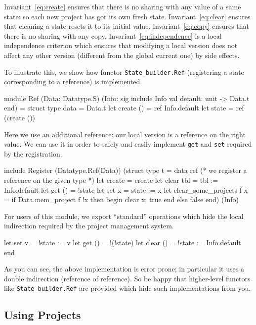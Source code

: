 Invariant~\ref{eq:create} ensures that there is no sharing%
 with any value of a same state: so each new project has
got its own fresh state. Invariant~\ref{eq:clear} ensures that cleaning
a state resets it to its initial
value. Invariant~\ref{eq:copy} ensures that there is no sharing with any
copy. Invariant~\ref{eq:independence} is a local independence criterion which
ensures that modifying a local version does not affect any other version
(different from the global current one) by side effects.
\begin{example}
  To illustrate this, we show how functor
  \texttt{State\_builder.Ref} (registering a state
  corresponding to a reference) is implemented.
\begin{ocamlcode}
module Ref
  (Data: Datatype.S)
  (Info: sig include Info val default: unit -> Data.t end) =
struct
  type data = Data.t
  let create () = ref Info.default
  let state = ref (create ())
\end{ocamlcode}
Here we use an additional reference: our local version%
 is a reference on the right value. We can
use it in order to safely and easily implement \texttt{get} and \texttt{set}
required by the registration.
\begin{ocamlcode}
  include Register
    (Datatype.Ref(Data))
    (struct
      type t = data ref (* we register a reference on the given type *)
      let create = create
      let clear tbl = tbl := Info.default
      let get () = !state
      let set x = state := x
      let clear_some_projects f x =
        if Data.mem_project f !x then begin clear x; true end else false
    end)
   (Info)
\end{ocamlcode}
For users of this module, we export ``standard'' operations which hide the
local indirection required by the project management system.
\begin{ocamlcode}
  let set v = !state := v
  let get () = !(!state)
  let clear () = !state := Info.default
end
\end{ocamlcode}
As you can see, the above implementation is error prone; in particular it uses
a double indirection (reference of reference). So be happy that higher-level
functors like \texttt{State\_builder.Ref} are provided which hide such
implementations from you.
\end{example}

\subsection{Using Projects}\label{proj:use}

